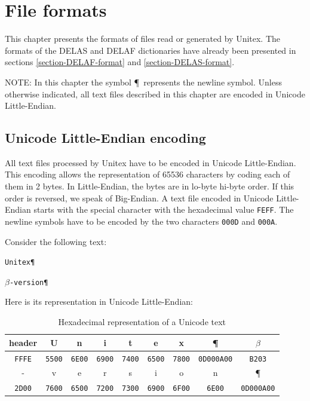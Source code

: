 \chapter{File formats}
\label{chap-file-formats}
This chapter presents the formats of files read or generated by Unitex. The
formats of the DELAS and DELAF dictionaries have already been presented in
sections \ref{section-DELAF-format} and \ref{section-DELAS-format}.

\bigskip
\noindent NOTE: In this chapter the symbol \P ~represents the newline symbol.
Unless otherwise indicated, all text files described in this chapter are encoded
in Unicode Little-Endian.

\section{Unicode Little-Endian encoding}
All text files processed by Unitex have to be encoded in Unicode Little-Endian.
This encoding allows the representation of 65536 characters by coding each of
them in 2 bytes. In Little-Endian, the bytes are in lo-byte hi-byte order. If
this order is reversed, we speak of Big-Endian. A text file encoded in Unicode
Little-Endian starts with the special character with the hexadecimal value
\verb+FEFF+. The newline symbols have to be encoded by the two characters
\verb+000D+ and \verb+000A+.

\bigskip
\noindent Consider the following text:

\bigskip
\texttt{Unitex\P}

\texttt{$\beta$-version\P}

\bigskip
\noindent Here is its representation in Unicode Little-Endian:

\bigskip
\begin{table}[h]
\begin{center}
\begin{tabular}{|c|c|c|c|c|c|c|c|c|}
\hline
header & U & n & i & t & e & x & \P & $\beta$
\\
\hline
\verb+FFFE+ & \verb+5500+ & \verb+6E00+ & \verb+6900+ & \verb+7400+ & \verb+6500+ & \verb+7800+
& \verb+0D000A00+ & \verb+B203+
\\
\hline
\hline
- & v & e & r & s & i & o & n & \P
\\
\hline
\verb+2D00+ & \verb+7600+ & \verb+6500+ & \verb+7200+ & \verb+7300+ & \verb+6900+ & \verb+6F00+
& \verb+6E00+ & \verb+0D000A00+
\\
\hline
\end{tabular}
\caption{Hexadecimal representation of a Unicode text}
\end{center}
\end{table}

